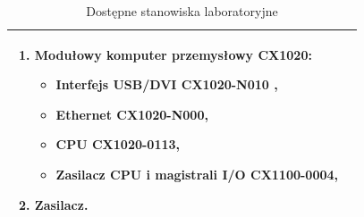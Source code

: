\begin{table}[!htb]
\begin{center}
\begin{tabular}{| p{} || p{} |}
\begin{enumerate}
\item Modułowy komputer przemysłowy CX1020:
\begin{itemize}
\item Interfejs USB/DVI CX1020-N010 ,
\item Ethernet CX1020-N000,
\item CPU CX1020-0113,
\item Zasilacz CPU i magistrali I/O CX1100-0004,
\end{itemize}
\item Zasilacz.
\end{enumerate}
\\\hline                                            
\end{tabular}
\end{center}
\vspace*{-6mm}
  \caption{Dostępne stanowiska laboratoryjne}
	\label{stanowiska}
\end{table}


